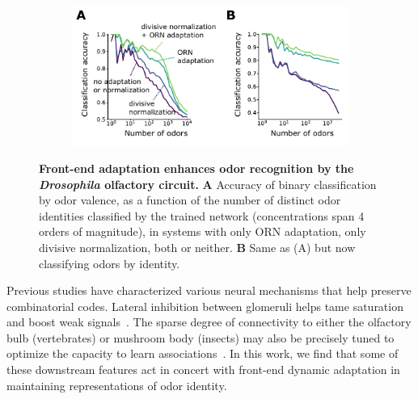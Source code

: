 \documentclass[10pt,prl,aps,showpacs,twocolumn,unsortedaddress,showkeys,linenumbers]{revtex4-1}
\begin{document}

\begin{figure}[!t]
	\centering
	\begin{subfigure}[t]{\linewidth}
		\includegraphics[width=\textwidth]{figures/5_downstream}
		\label{fig:downstream_a}	
	\end{subfigure}
	\begin{subfigure}[t]{0\linewidth}
		\label{fig:downstream_b}
	\end{subfigure}
	\caption{\footnotesize{\textbf{Front-end adaptation enhances odor recognition by the \textit{Drosophila} olfactory circuit.} 
	\textbf{A} Accuracy of binary classification by odor valence, as a function of the number of distinct odor identities classified by the trained network (concentrations span 4 orders of magnitude), in systems with only ORN adaptation, only divisive normalization, both or neither. \textbf{B} Same as (A) but now classifying odors  by identity.
	}}
	\label{fig:downstream}
\end{figure}


Previous studies have characterized various neural mechanisms that help preserve combinatorial codes. 
Lateral inhibition between glomeruli helps tame saturation and boost weak signals~\cite{divisive_normalization}. %
The sparse degree of connectivity to either the olfactory bulb (vertebrates) or mushroom body (insects) %
may also be precisely tuned to optimize the capacity to learn associations~\cite{litwinkumar}. In this work, we find that some of these downstream features act in concert with front-end dynamic adaptation in maintaining representations of odor identity.
\end{document}
